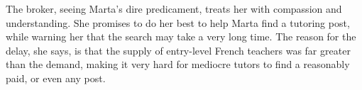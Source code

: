 The broker, seeing Marta's dire predicament, treats her with compassion and understanding.
She promises to do her best to help Marta find a tutoring post, while warning her that the search may take a very long time.
The reason for the delay, she says, is that the supply of entry-level French teachers was far greater than the demand, making it very hard for mediocre tutors to find a reasonably paid, or even any post.
